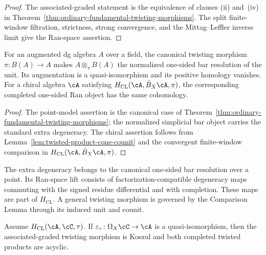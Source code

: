 \begin{proof}
The associated-graded statement is the equivalence of clauses
\textup{(ii)} and~\textup{(iv)} in
Theorem~\ref{thm:ordinary-fundamental-twisting-morphisms}.  The split
finite-window filtration, strictness, strong convergence, and the
Mittag--Leffler inverse limit give the Ran-space assertion.
\end{proof}

\begin{proposition}
\label{prop:canonical-contracting-homotopy}
For an augmented dg algebra \(A\) over a field, the canonical twisting
morphism \(\pi\colon B(A)\to A\) makes
\(A\otimes_\pi B(A)\) the normalized one-sided bar resolution of the
unit.  Its augmentation is a quasi-isomorphism and its positive
homology vanishes.  For a chiral algebra \(\cA\) satisfying
\(H_{\mathrm{CL}}(\cA,\bar B_X\cA,\pi)\), the corresponding completed
one-sided Ran object has the same cohomology.
\end{proposition}

\begin{proof}
The point-model assertion is the canonical case of
Theorem~\ref{thm:ordinary-fundamental-twisting-morphisms}; the
normalized simplicial bar object carries the standard extra
degeneracy.  The chiral assertion follows from
Lemma~\ref{lem:twisted-product-cone-counit} and the convergent
finite-window comparison in
\(H_{\mathrm{CL}}(\cA,\bar B_X\cA,\pi)\).
\end{proof}

\begin{remark}
\label{rem:canonical-homotopy-scope}
The extra degeneracy belongs to the canonical one-sided bar
resolution over a point.  Its Ran-space lift consists of
factorization-compatible degeneracy maps commuting with the signed
residue differential and with completion.  These maps are part of
\(H_{\mathrm{CL}}\).  A general twisting morphism is governed by the
Comparison Lemma through its induced unit and counit.
\end{remark}

\begin{lemma}
\label{lem:filtered-comparison}
Assume \(H_{\mathrm{CL}}(\cA,\cC,\tau)\).  If
\(\varepsilon_\tau\colon\Omega_X\cC\to\cA\) is a
quasi-isomorphism, then the associated-graded twisting morphism is
Koszul and both completed twisted products are acyclic.
\end{lemma}

